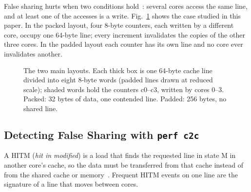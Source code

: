 \documentclass[journal]{IEEEtran}
\begin{document}
False sharing hurts when two conditions hold~\cite{tang2023kernel}: several
cores access the same line, and at least one of the accesses is a write.
Fig.~\ref{fig:layout} shows the case studied in this paper. In the packed
layout, four 8-byte counters, each written by a different core, occupy one
64-byte line; every increment invalidates the copies of the other three cores.
In the padded layout each counter has its own line and no core ever invalidates
another.

\begin{figure}[!t]
\centering
{}
\caption{The two main layouts. Each thick box is one 64-byte cache line
divided into eight 8-byte words (padded lines drawn at reduced scale); shaded words
hold the counters c0--c3, written by cores 0--3. Packed: 32 bytes of data, one
contended line. Padded: 256 bytes, no shared line.}
\label{fig:layout}
\end{figure}

\subsection{Detecting False Sharing with \texttt{perf c2c}}
A HITM (\emph{hit in modified}) is a load that finds the requested line in
state M in another core's cache, so the data must be transferred from that cache
instead of from the shared cache or memory~\cite{perf_c2c_man}. Frequent HITM
events on one line are the signature of a line that moves between cores.
\end{document}
